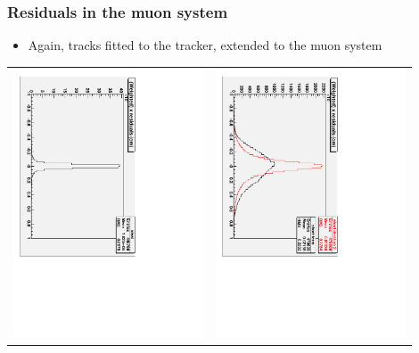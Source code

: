 \documentclass[compress]{beamer}
\begin{document}
\begin{frame}
\frametitle{Residuals in the muon system}

\begin{itemize}
\item Again, tracks fitted to the tracker, extended to the muon system
\end{itemize}

\begin{center}
\begin{tabular}{p{0.45\linewidth} p{0.45\linewidth}}
\begin{minipage}{\linewidth}
\includegraphics[height=\linewidth, angle=90]{deweight_outin_ideal.pdf}
\end{minipage} &
\begin{minipage}{\linewidth}
\includegraphics[height=\linewidth, angle=90]{deweight_outin_short.pdf}

\end{minipage}
\end{tabular}
\end{center}
\end{frame}
\end{document}
